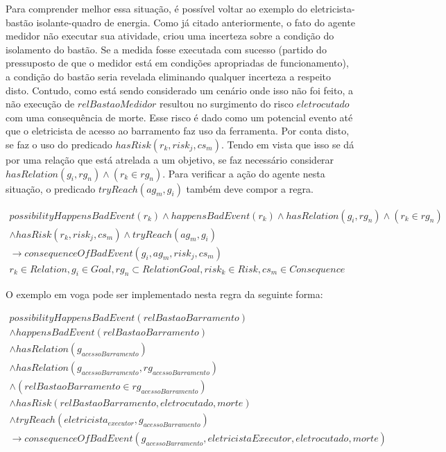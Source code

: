 Para comprender melhor essa situação, é possível voltar ao exemplo do eletricista-bastão isolante-quadro de energia. Como já citado anteriormente, o fato 
do agente medidor não executar sua atividade, criou uma incerteza sobre a condição do isolamento do bastão. Se a medida fosse executada com sucesso 
(partido do pressuposto de que o medidor está em condições apropriadas de funcionamento), a condição do bastão seria revelada eliminando qualquer incerteza 
a respeito disto. Contudo, como está sendo considerado um cenário onde isso não foi feito, a não execução de $relBastaoMedidor$ resultou no surgimento 
do risco $eletrocutado$ com uma consequência de morte. Esse risco é dado como um potencial evento até que o eletricista de acesso ao barramento faz uso da 
ferramenta. Por conta disto, se faz o uso do predicado $hasRisk(r_k,risk_j,cs_m)$. Tendo em vista que isso se dá por uma relação que está atrelada a um 
objetivo, se faz necessário considerar $hasRelation(g_i,rg_n) \wedge (r_k \in rg_n)$. Para verificar a ação do agente nesta situação, o predicado 
$tryReach(ag_m,g_i)$ também deve compor a regra.


\begin{eqnarray}\label{paybutiamnotguilty}
	possibilityHappensBadEvent(r_k) \wedge  happensBadEvent(r_k) \wedge hasRelation(g_i,rg_n) \wedge (r_k \in rg_n) \nonumber \\ 
	\wedge hasRisk(r_k,risk_j,cs_m) \wedge tryReach(ag_m,g_i) \nonumber \\ 
	\to consequenceOfBadEvent(g_i,ag_m,risk_j,cs_m) \nonumber \\ 
    r_k \in Relation, g_i \in Goal, rg_n \subset RelationGoal, risk_k \in Risk, cs_m \in Consequence
\end{eqnarray}

O exemplo em voga pode ser implementado nesta regra da seguinte forma: 


\begin{eqnarray}\nonumber
   possibilityHappensBadEvent(relBastaoBarramento) \nonumber \\
    \wedge happensBadEvent(relBastaoBarramento) \nonumber \\ 
    \wedge hasRelation(g_{acessoBarramento}) \nonumber \\  
    \wedge hasRelation(g_{acessoBarramento},rg_{acessoBarramento}) \nonumber \\  
    \wedge (relBastaoBarramento \in rg_{acessoBarramento}) \nonumber \\ 
    \wedge hasRisk(relBastaoBarramento,eletrocutado,morte) \nonumber \\  
    \wedge tryReach(eletricista_{executor},g_{acessoBarramento}) \nonumber \\ 
    \to consequenceOfBadEvent(g_{acessoBarramento},eletricistaExecutor,eletrocutado,morte) \\ \nonumber
\end{eqnarray}

